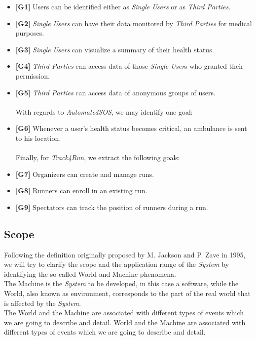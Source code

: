 \documentclass[titlepage]{article}
\begin{document}
		\begin{itemize} %

   			 \item {\bf [G1]} Users can be identified either as {\it {\it Single User}s} or as {\it Third Parties}.				
			 \item {\bf [G2]} {\it {\it Single User}s} can have their data monitored by {\it Third Parties} for medical purposes.
   			 \item {\bf [G3]} {\it {\it Single User}s} can visualize a summary of their health status.
   			 \item {\bf [G4]} {\it Third Parties} can access data of those {\it Single User}s who granted their permission.
   			 \item {\bf [G5]} {\it Third Parties} can access data of anonymous groups of users. \\
			 \\
With regards to {\it {\it AutomatedSOS}}, we may identify one goal: 
   			 \item {\bf [G6]} Whenever a user’s health status becomes critical, an ambulance is sent to his location. \\	
			 \\
 Finally, for {\it Track4Run}, we extract the following goals:
			  \item {\bf [G7]} Organizers can create and manage runs.
			  \item {\bf [G8]} Runners can enroll in an existing run.
			  \item {\bf [G9]} Spectators can track the position of runners during a run.
			\end{itemize}
			
	\subsection{Scope}
Following the definition originally proposed by M. Jackson and P. Zave in 1995, we will try to clarify the scope and the application range of the {\it System} by identifying the so called World and Machine phenomena.\\
The Machine is the {\it System} to be developed, in this case a software, while the World, also known as environment, corresponds to the part of the real world that is affected by the {\it System}. \\
The World and the Machine are associated with different types of events which we are going to describe and detail.
World and the Machine are associated with different types of events which we are going to describe and detail.\\		
\end{document}
